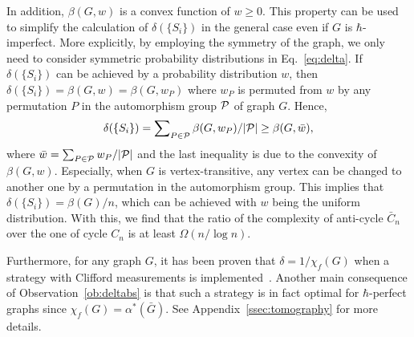 \documentclass[
12pt,
prx,
aps,
reprint,
a4paper,
longbibliograph,
nofootinbib,
nobibnotes,
superscriptaddress
]{revtex4-2}
\theoremstyle{definition}
\begin{document}
In addition, $\beta(G,w)$ is a convex function of $w\ge 0$.
This property can be used to simplify the calculation of $\delta(\{S_i\})$ in the general case even if $G$ is $\hbar$-imperfect.
More explicitly,
by employing the symmetry of the graph, we only need to consider symmetric probability distributions in Eq.~\eqref{eq:delta}. 
If $\delta(\{S_i\})$ can be achieved by a probability distribution $w$, then $\delta(\{S_i\}) = \beta(G,w) = \beta(G,w_P)$ where $w_P$ is permuted from $w$ by any permutation $P$ in the automorphism group ${\cal P}$ of graph $G$. Hence, 
\begin{equation}
	\delta(\{S_i\}) = \sum\nolimits_{P\in {\cal P}}  \beta(G,w_P)/ |{\cal P}| \ge \beta(G,\bar{w}),
\end{equation}
where $\bar{w} = \sum_{P\in {\cal P}} w_P/|{\cal P}|$ and the last inequality is due to the convexity of $\beta(G,w)$.
Especially, when $G$ is vertex-transitive, any vertex can be changed to another one by a permutation in the automorphism group. This implies that $\delta(\{S_i\}) = \beta(G)/n$, which can be achieved with $w$ being the uniform distribution. With this, we find that the ratio of the complexity of anti-cycle $\bar{C}_n$ over the one of cycle $C_n$ is at least $\Omega(n/\log n)$.

Furthermore, for any graph $G$, it has been proven that $\delta = 1/\chi_f(G)$ when a strategy with Clifford measurements is implemented~\cite{chen2024Optimal}. Another main consequence of Observation~\ref{ob:deltabs} is that such a strategy is in fact optimal for $\hbar$-perfect graphs since $\chi_f(G) = \alpha^*(\bar{G})$. See Appendix~\ref{ssec:tomography} for more details.
\end{document}
